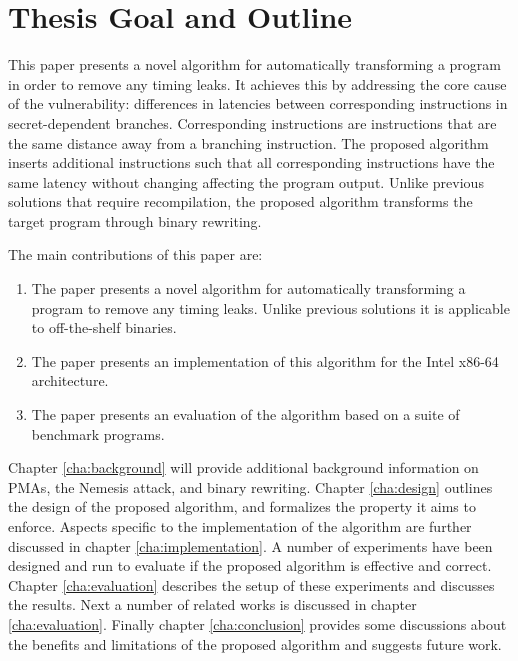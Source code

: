 \section{Thesis Goal and Outline}
This paper presents a novel algorithm for automatically transforming a program in order to remove any timing leaks. It achieves this by addressing the core cause of the vulnerability: differences in 
latencies between corresponding instructions in secret-dependent branches. Corresponding instructions are instructions that are the same distance away from a branching instruction. 
The proposed algorithm inserts additional instructions such that all corresponding instructions have the same latency without changing affecting the program output. 
Unlike previous solutions that require recompilation, the proposed algorithm transforms the target program through binary rewriting. 

The main contributions of this paper are:
\begin{enumerate}
\item The paper presents a novel algorithm for automatically transforming a program to remove any timing leaks. Unlike previous solutions it is applicable to off-the-shelf binaries. 
\item The paper presents an implementation of this algorithm for the Intel x86-64 architecture. 
\item The paper presents an evaluation of the algorithm based on a suite of benchmark programs. 
\end{enumerate}

Chapter \ref{cha:background} will provide additional background information on PMAs, the Nemesis attack, and binary rewriting. 
Chapter \ref{cha:design} outlines the design of the proposed algorithm, and formalizes the property it aims to enforce.  
Aspects specific to the implementation of the algorithm are further discussed in chapter \ref{cha:implementation}. 
A number of experiments have been designed and run to evaluate if the proposed algorithm is effective and correct. 
Chapter \ref{cha:evaluation} describes the setup of these experiments and discusses the results. 
Next a number of related works is discussed in chapter \ref{cha:evaluation}.
Finally chapter \ref{cha:conclusion} provides some discussions about the benefits and limitations of the proposed algorithm and suggests 
future work. 